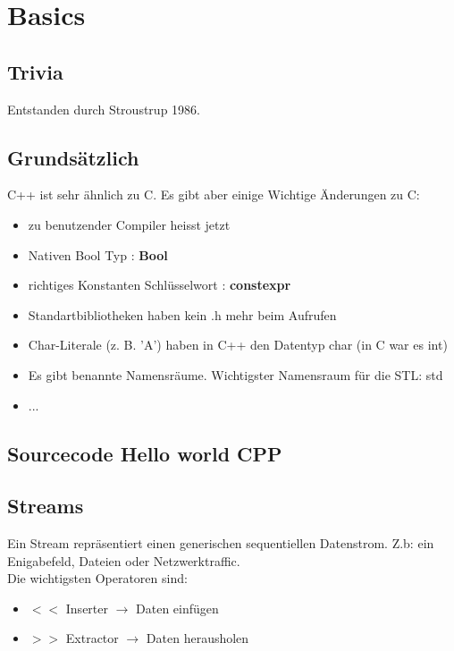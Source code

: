 \section{Basics}

\subsection{Trivia}

Entstanden durch Stroustrup 1986.\\

\subsection{Grundsätzlich}

C++ ist sehr ähnlich zu C. Es gibt aber einige Wichtige Änderungen zu C:

\begin{itemize}[itemsep=1pt, parsep=0pt]
    \item zu benutzender Compiler heisst jetzt 
    \item Nativen Bool Typ : \textbf{Bool}
    \item richtiges Konstanten Schlüsselwort : \textbf{constexpr}
    \item Standartbibliotheken haben kein .h mehr beim Aufrufen
    \item Char-Literale (z. B. 'A') haben in C++ den Datentyp char (in C war es int)
    \item Es gibt benannte Namensräume. Wichtigster Namensraum für die STL: std
    \item ...
\end{itemize}

\subsection{Sourcecode Hello world CPP}



\subsection{Streams}

Ein Stream repräsentiert einen generischen sequentiellen Datenstrom. Z.b: ein Enigabefeld, Dateien oder Netzwerktraffic.\\
Die wichtigsten Operatoren sind:

\begin{itemize}[itemsep=1pt, parsep=0pt]
    \item \textbf{$<<$} Inserter $\rightarrow$  Daten einfügen
    \item \textbf{$>>$} Extractor $\rightarrow$ Daten herausholen
\end{itemize}


